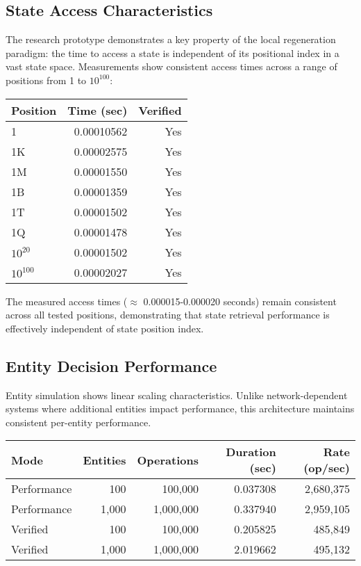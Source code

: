 \documentclass[14pt, a4paper]{extarticle}
\begin{document}
\subsection{State Access Characteristics}
The research prototype demonstrates a key property of the local regeneration paradigm: the time to access a state is independent of its positional index in a vast state space. Measurements show consistent access times across a range of positions from 1 to $10^{100}$:

\begin{center}
\begin{tabular}{|l|r|r|}
\hline
\textbf{Position} & \textbf{Time (sec)} & \textbf{Verified} \\
\hline
1 & 0.00010562 & Yes \\
1K & 0.00002575 & Yes \\
1M & 0.00001550 & Yes \\
1B & 0.00001359 & Yes \\
1T & 0.00001502 & Yes \\
1Q & 0.00001478 & Yes \\
$10^{20}$ & 0.00001502 & Yes \\
$10^{100}$ & 0.00002027 & Yes \\
\hline
\end{tabular}
\end{center}

The measured access times ($\approx$ 0.000015-0.000020 seconds) remain consistent across all tested positions, demonstrating that state retrieval performance is effectively independent of state position index.

\subsection{Entity Decision Performance}

Entity simulation shows linear scaling characteristics. Unlike network-dependent systems where additional entities impact performance, this architecture maintains consistent per-entity performance.

\begin{center}
\begin{tabular}{|l|r|r|r|r|}
\hline
\textbf{Mode} & \textbf{Entities} & \textbf{Operations} & \textbf{Duration (sec)} & \textbf{Rate (op/sec)} \\
\hline
Performance & 100 & 100,000 & 0.037308 & 2,680,375 \\
Performance & 1,000 & 1,000,000 & 0.337940 & 2,959,105 \\
Verified & 100 & 100,000 & 0.205825 & 485,849 \\
Verified & 1,000 & 1,000,000 & 2.019662 & 495,132 \\
\hline
\end{tabular}
\end{center}
\end{document}
